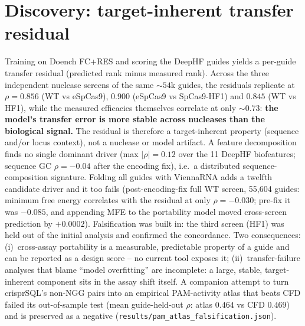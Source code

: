 \documentclass[12pt]{article}
\begin{document}
\section{Discovery: target-inherent transfer residual}
\label{sec:discovery}
Training on Doench FC+RES and scoring the DeepHF guides yields a per-guide
transfer residual (predicted rank minus measured rank). Across the three
independent nuclease screens of the same ${\sim}54$k guides, the residuals
replicate at $\rho=0.856$ (WT vs eSpCas9), $0.900$ (eSpCas9 vs SpCas9-HF1)
and $0.845$ (WT vs HF1), while the measured efficacies themselves correlate
at only ${\sim}0.73$: \textbf{the model's transfer error is more stable
across nucleases than the biological signal.} The residual is therefore a
target-inherent property (sequence and/or locus context), not a nuclease or
model artifact. A feature decomposition finds no single dominant driver
(max $|\rho|=0.12$ over the 11 DeepHF biofeatures; sequence GC
$\rho=-0.04$ after the encoding fix), i.e.\ a
distributed sequence-composition signature. Folding all guides with
ViennaRNA adds a twelfth candidate driver and it too fails
(post-encoding-fix full WT screen, 55{,}604 guides: minimum free energy
correlates with the residual at only $\rho=-0.030$; pre-fix it was
$-0.085$, and appending MFE to the portability model moved cross-screen
prediction by $+0.0002$). Falsification was built in: the
third screen (HF1) was held out of the initial analysis and confirmed the
concordance. Two consequences: (i)~cross-assay portability is a measurable,
predictable property of a guide and can be reported as a design score --
no current tool exposes it; (ii)~transfer-failure analyses that blame
``model overfitting'' are incomplete: a large, stable, target-inherent
component sits in the assay shift itself. A companion attempt to turn
crisprSQL's non-NGG pairs into an empirical PAM-activity atlas that beats
CFD failed its out-of-sample test (mean guide-held-out $\rho$: atlas
$0.464$ vs CFD $0.469$) and is preserved as a negative
(\texttt{results/pam\_atlas\_falsification.json}).
\end{document}
